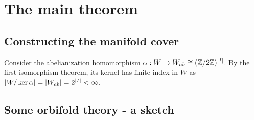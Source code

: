 \chapter{The main theorem}

\section{Constructing the manifold cover}


Consider the abelianization homomorphism \(\alpha : W \to W_{ab} \cong (\mathbb{Z} / 2\mathbb{Z})^{\vert I \vert}\).
By the first isomorphism theorem, its kernel has finite index in \(W\) as \(\left\vert W/\ker \alpha\right\vert = \left\vert W_{ab}\right\vert = 2^{\left\vert I\right\vert} < \infty\).


\section{Some orbifold theory - a sketch}